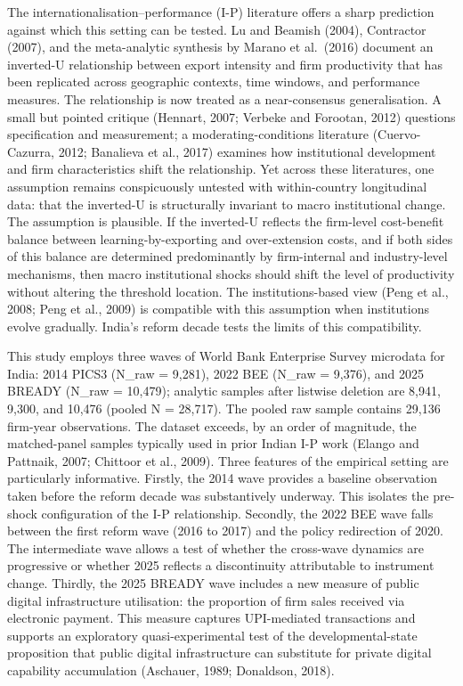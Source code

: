 \documentclass[
  12pt]{article}
\begin{document}
The internationalisation--performance (I-P) literature offers a sharp
prediction against which this setting can be tested. Lu and Beamish
(2004), Contractor (2007), and the meta-analytic synthesis by Marano et
al.~(2016) document an inverted-U relationship between export intensity
and firm productivity that has been replicated across geographic
contexts, time windows, and performance measures. The relationship is
now treated as a near-consensus generalisation. A small but pointed
critique (Hennart, 2007; Verbeke and Forootan, 2012) questions
specification and measurement; a moderating-conditions literature
(Cuervo-Cazurra, 2012; Banalieva et al., 2017) examines how
institutional development and firm characteristics shift the
relationship. Yet across these literatures, one assumption remains
conspicuously untested with within-country longitudinal data: that the
inverted-U is structurally invariant to macro institutional change. The
assumption is plausible. If the inverted-U reflects the firm-level
cost-benefit balance between learning-by-exporting and over-extension
costs, and if both sides of this balance are determined predominantly by
firm-internal and industry-level mechanisms, then macro institutional
shocks should shift the level of productivity without altering the
threshold location. The institutions-based view (Peng et al., 2008; Peng
et al., 2009) is compatible with this assumption when institutions
evolve gradually. India's reform decade tests the limits of this
compatibility.

This study employs three waves of World Bank Enterprise Survey microdata
for India: 2014 PICS3 (N\_raw = 9,281), 2022 BEE (N\_raw = 9,376), and
2025 BREADY (N\_raw = 10,479); analytic samples after listwise deletion
are 8,941, 9,300, and 10,476 (pooled N = 28,717). The pooled raw sample
contains 29,136 firm-year observations. The dataset exceeds, by an order
of magnitude, the matched-panel samples typically used in prior Indian
I-P work (Elango and Pattnaik, 2007; Chittoor et al., 2009). Three
features of the empirical setting are particularly informative. Firstly,
the 2014 wave provides a baseline observation taken before the reform
decade was substantively underway. This isolates the pre-shock
configuration of the I-P relationship. Secondly, the 2022 BEE wave falls
between the first reform wave (2016 to 2017) and the policy redirection
of 2020. The intermediate wave allows a test of whether the cross-wave
dynamics are progressive or whether 2025 reflects a discontinuity
attributable to instrument change. Thirdly, the 2025 BREADY wave
includes a new measure of public digital infrastructure utilisation: the
proportion of firm sales received via electronic payment. This measure
captures UPI-mediated transactions and supports an exploratory
quasi-experimental test of the developmental-state proposition that
public digital infrastructure can substitute for private digital
capability accumulation (Aschauer, 1989; Donaldson, 2018).
\end{document}
